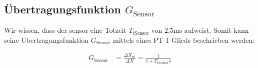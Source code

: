 	\subsection*{Übertragungsfunktion $G_{\mathrm{Sensor}}$ }\label{sub:transfer_Gsensor}
	Wir wissen, dass der sensor eine Totzeit $T_{t\mathrm{Sensor}}$ von $2.5 \si{\milli\second}$ aufweist. Somit kann seine Übertragungsfunktion $G_{\mathrm{Sensor}}$ mittels eines PT-1 Glieds beschrieben werden:

	\begin{align}\label{eq:G_sens} 
	G_{\mathrm{Sensor}} &= \frac{\Delta X_{m}}{\Delta X} = \frac{1}{1 + T_{t\mathrm{Sensor}}s}
	\end{align}









